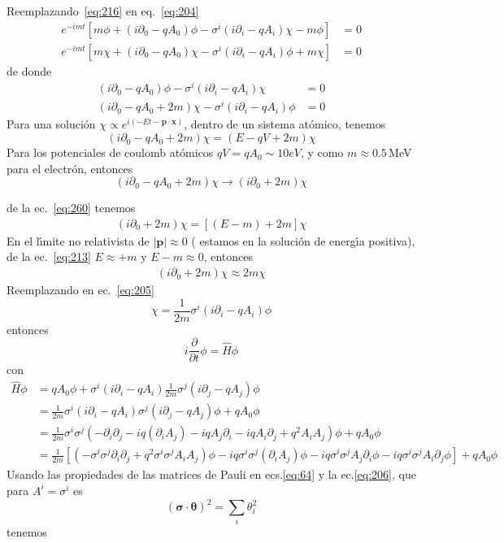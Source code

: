 Reemplazando~\eqref{eq:216} en eq.~\eqref{eq:204}
\begin{align}
  e^{-i m t}[m\phi+(i\partial_0- q A_0)\phi-{\sigma}^i(i\partial_i-q A_i)\chi-m\phi]  &=0\nonumber\\
  e^{-i m t}[m\chi+(i\partial_0-q A_0)\chi-{\sigma}^i(i\partial_i-q A_i)\phi+m\chi]  &=0
\end{align}
de donde
\begin{align}
  \label{eq:205}
  (i\partial_0- q A_0)\phi-{\sigma}^i(i\partial_i-q A_i)\chi  &=0\nonumber\\
  (i\partial_0-q A_0+2m)\chi-{\sigma}^i(i\partial_i-q A_i)\phi  &=0
\end{align}
Para una soluci\'on $\chi\propto e^{i(-Et-\mathbf{p}\cdot \mathbf{x})}$, dentro de un sistema at\'omico,  tenemos
\begin{equation}
  (i\partial_0-q A_0+2m)\chi=(E-q V+2m)\chi
\end{equation}
Para los potenciales de coulomb at\'omicos $qV=qA_0\sim10 eV$, y como $m\approx0.5\,$MeV para el electr\'on, entonces
\begin{equation}
  (i\partial_0-q A_0+2m)\chi\to(i\partial_0+2m)\chi
\end{equation}

de la ec.~\eqref{eq:260}  tenemos
\begin{align}
  (i\partial_0+2m)\chi=[(E-m)+2m]\chi
\end{align}
En el l\'\i mite no relativista de $|\mathbf{p}|\approx0$ ( estamos en la soluci\'on de energ\'\i a positiva), de la ec.~\eqref{eq:213} $E\approx+m$ y $E-m\approx0$, entonces
\begin{align}
  (i\partial_0+2m)\chi\approx2m\chi
\end{align}
Reemplazando en ec.~\eqref{eq:205}
\begin{equation}
  \chi=\frac{1}{2m}\sigma^i(i\partial_i-q A_i)\phi
\end{equation}
entonces
\begin{equation}
  i\frac{\partial}{\partial t}\phi=\widehat{H}\phi
\end{equation}
con
\begin{align}
  \widehat{H}\phi&= q A_0\phi+\sigma^i(i\partial_i-q A_i)\frac{1}{2m}\sigma^j(i\partial_j-q A_j)\phi  \nonumber\\
&=\frac{1}{2m}\sigma^i(i\partial_i-q A_i)\sigma^j(i\partial_j-q A_j)\phi+q A_0\phi\nonumber\\
  &=\frac{1}{2m}\sigma^i\sigma^j(-\partial_i\partial_j-i q(\partial_i A_j)-i qA_j\partial_i -i q A_i\partial_j+q^2 A_i A_j)\phi+q A_0\phi\nonumber\\
    &=\frac{1}{2m}\left[(-\sigma^i\sigma^j\partial_i\partial_j+q^2\sigma^i\sigma^jA_i A_j)\phi-i q \sigma^i\sigma^j (\partial_i A_j)\phi
    -i q\sigma^i\sigma^j A_j \partial_i\phi-i q\sigma^i\sigma^j A_i\partial_j\phi\right]+q A_0\phi\nonumber
\end{align}
Usando las propiedades de las matrices de Pauli en ecs.\eqref{eq:64} y la ec.\eqref{eq:206}, que  para $A^i=\sigma^i$ es
\begin{equation}
  (\boldsymbol{\sigma}\cdot\boldsymbol{\theta})^2=\sum_i\theta_i^2
\end{equation}
tenemos

